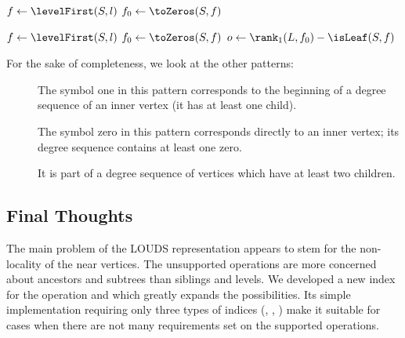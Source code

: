 \begin{algorithm}
\begin{algorithmic}	
 
	\State $f \gets \levelFirst(S, l)$ 
	\State $f_0 \gets \toZeros(S, f)$
	\State {}
\EndFunction
\end{algorithmic}
\end{algorithm}

\begin{algorithm}
\begin{algorithmic}
	\State $f \gets \levelFirst(S, l)$ 
	\State $f_0 \gets \toZeros(S, f)$
	\State $o \gets \rank_1(L, f_0) - \isLeaf(S, f)$ 
	\State {}
\EndFunction
\end{algorithmic}
\end{algorithm}

\bigbreak

For the sake of completeness, we look at the other patterns:
\begin{description}
	\item[]
	The symbol one in this pattern corresponds to the beginning of a degree sequence of an inner vertex (it has at least one child).
	\item[]
	The symbol zero in this pattern corresponds directly to an inner vertex; its degree sequence contains at least one zero.
	\item[]
	It is part of a degree sequence of vertices which have at least two children.
\end{description}

\subsection{Final Thoughts}

The main problem of the LOUDS representation appears to stem for the non-locality of the near vertices.
The unsupported operations are more concerned about ancestors and subtrees than siblings and levels.
We developed a new index for the operation \dep{} and \levelAny{} which greatly expands the possibilities.
Its simple implementation requiring only three types of indices (\rank{}, \select{}, \blockOfD{}) make it suitable for cases when there are not many requirements set on the supported operations.

